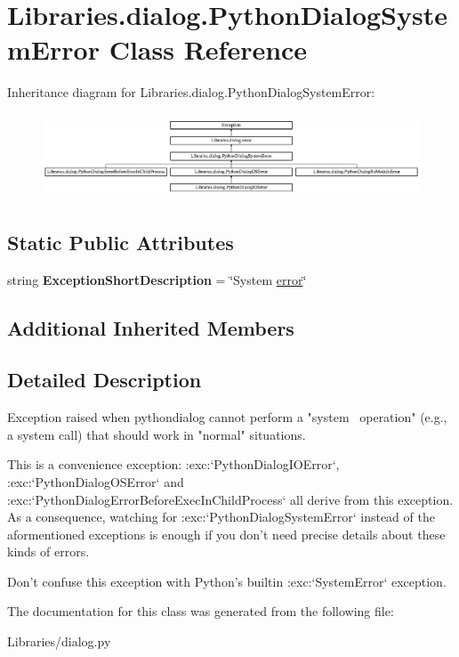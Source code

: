\hypertarget{class_libraries_1_1dialog_1_1_python_dialog_system_error}{}\section{Libraries.\+dialog.\+Python\+Dialog\+System\+Error Class Reference}
\label{class_libraries_1_1dialog_1_1_python_dialog_system_error}
Inheritance diagram for Libraries.\+dialog.\+Python\+Dialog\+System\+Error\+:\begin{figure}[H]
\begin{center}
\leavevmode
\includegraphics[height=2.536232cm]{class_libraries_1_1dialog_1_1_python_dialog_system_error}
\end{center}
\end{figure}
\subsection*{Static Public Attributes}
\begin{DoxyCompactItemize}
\item 
string {\bfseries Exception\+Short\+Description} = \char`\"{}System \hyperlink{class_libraries_1_1dialog_1_1error}{error}\char`\"{}\hypertarget{class_libraries_1_1dialog_1_1_python_dialog_system_error_a8ab830e86f9360a4cde751849994924c}{}\label{class_libraries_1_1dialog_1_1_python_dialog_system_error_a8ab830e86f9360a4cde751849994924c}

\end{DoxyCompactItemize}
\subsection*{Additional Inherited Members}


\subsection{Detailed Description}
\begin{DoxyVerb}Exception raised when pythondialog cannot perform a "system \
operation" (e.g., a system call) that should work in "normal" situations.

This is a convenience exception: :exc:`PythonDialogIOError`,
:exc:`PythonDialogOSError` and
:exc:`PythonDialogErrorBeforeExecInChildProcess` all derive from
this exception. As a consequence, watching for
:exc:`PythonDialogSystemError` instead of the aformentioned
exceptions is enough if you don't need precise details about these
kinds of errors.

Don't confuse this exception with Python's builtin
:exc:`SystemError` exception.\end{DoxyVerb}
 

The documentation for this class was generated from the following file\+:\begin{DoxyCompactItemize}
\item 
Libraries/dialog.\+py\end{DoxyCompactItemize}
